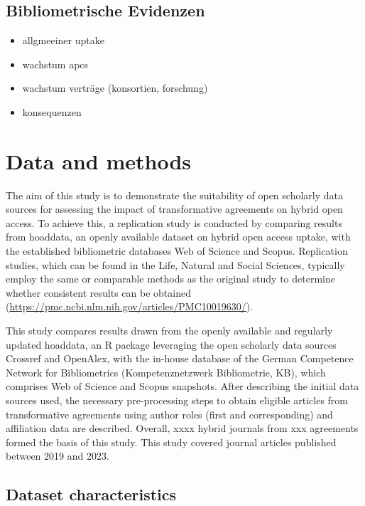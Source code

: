 \documentclass[a4paper,man,floatsintext,longtable,noextraspace,12pt]{apa6}
\providecommand{\tightlist}{%
  \setlength{\itemsep}{0pt}\setlength{\parskip}{0pt}}
\begin{document}
\subsection{Bibliometrische Evidenzen}\label{bibliometrische-evidenzen}

\begin{itemize}
\tightlist
\item
  allgmeeiner uptake
\item
  wachstum apcs
\item
  wachstum verträge (konsortien, forschung)
\item
  konsequenzen
\end{itemize}

\section{Data and methods}\label{data-and-methods}

The aim of this study is to demonstrate the suitability of open
scholarly data sources for assessing the impact of transformative
agreements on hybrid open access. To achieve this, a replication study
is conducted by comparing results from hoaddata, an openly available
dataset on hybrid open access uptake, with the established bibliometric
databases Web of Science and Scopus. Replication studies, which can be
found in the Life, Natural and Social Sciences, typically employ the
same or comparable methods as the original study to determine whether
consistent results can be obtained
(\url{https://pmc.ncbi.nlm.nih.gov/articles/PMC10019630/}).

This study compares results drawn from the openly available and
regularly updated hoaddata, an R package leveraging the open scholarly
data sources Crossref and OpenAlex, with the in-house database of the
German Competence Network for Bibliometrics (Kompetenznetzwerk
Bibliometrie, KB), which comprises Web of Science and Scopus snapshots.
After describing the initial data sources used, the necessary
pre-processing steps to obtain eligible articles from transformative
agreements using author roles (first and corresponding) and affiliation
data are described. Overall, xxxx hybrid journals from xxx agreements
formed the basis of this study. This study covered journal articles
published between 2019 and 2023.

\subsection{Dataset characteristics}\label{dataset-characteristics}
\end{document}
